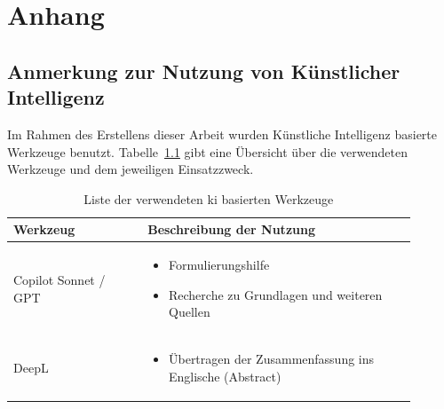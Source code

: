 \chapter{Anhang}
\label{app:appendix}

\section{Anmerkung zur Nutzung von Künstlicher Intelligenz}

Im Rahmen des Erstellens dieser Arbeit wurden Künstliche Intelligenz basierte Werkzeuge benutzt. Tabelle~\ref{tab:anhang_uebersicht_KI_werkzeuge} gibt eine Übersicht über die verwendeten Werkzeuge und dem jeweiligen Einsatzzweck.

\begin{table}[H]
    \centering
    \caption{Liste der verwendeten \gls{ki} basierten Werkzeuge}
    \label{tab:anhang_uebersicht_KI_werkzeuge}
	\renewcommand{\arraystretch}{1.5}
    \begin{tabular}{>{\raggedright\arraybackslash}p{0.3\linewidth} >{\raggedright\arraybackslash}p{0.6\linewidth}}
        \toprule
        \textbf{Werkzeug} & \textbf{Beschreibung der Nutzung} \\ \midrule
        Copilot Sonnet / GPT & \vspace{-\topsep}
            \begin{itemize}[noitemsep,topsep=0pt,partopsep=0pt,parsep=0pt]
                \item Formulierungshilfe
                \item Recherche zu Grundlagen und weiteren Quellen
            \end{itemize} \\ \midrule
        DeepL & \vspace{-\topsep}
            \begin{itemize}[noitemsep,topsep=0pt,partopsep=0pt,parsep=0pt]
                \item Übertragen der Zusammenfassung ins Englische (Abstract)
            \end{itemize} \\ \bottomrule
    \end{tabular}
\end{table}
